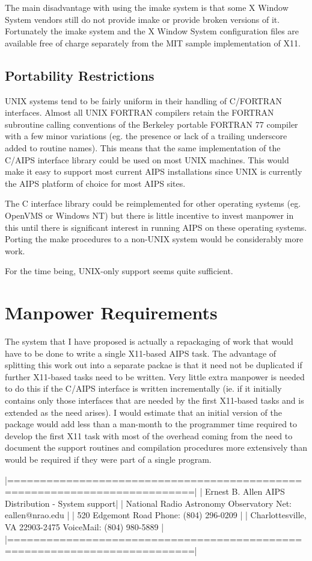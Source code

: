The main disadvantage with using the imake system is that some X
Window System vendors still do not provide imake or provide broken
versions of it.  Fortunately the imake system and the X Window System
configuration files are available free of charge separately from the
MIT sample implementation of X11.

\subsection{Portability Restrictions}

UNIX systems tend to be fairly uniform in their handling of C/FORTRAN
interfaces.  Almost all UNIX FORTRAN compilers retain the FORTRAN
subroutine calling conventions of the Berkeley portable FORTRAN 77
compiler with a few minor variations (eg. the presence or lack of a
trailing underscore added to routine names).  This means that the same
implementation of the C/AIPS interface library could be used on most
UNIX machines.  This would make it easy to support most current AIPS
installations since UNIX is currently the AIPS platform of choice for
most AIPS sites.

The C interface library could be reimplemented for other operating
systems (eg. OpenVMS or Windows NT) but there is little incentive to
invest manpower in this until there is significant interest in running
AIPS on these operating systems.  Porting the make procedures to a
non-UNIX system would be considerably more work.

For the time being, UNIX-only support seems quite sufficient.

\section{Manpower Requirements}
\label{sec:manpower}

The system that I have proposed is actually a repackaging of work that
would have to be done to write a single X11-based AIPS task.  The
advantage of splitting this work out into a separate packae is that it
need not be duplicated if further X11-based tasks need to be written.
Very little extra manpower is needed to do this if the C/AIPS
interface is written incrementally (ie. if it initially contains only
those interfaces that are needed by the first X11-based tasks and is
extended as the need arises).  I would estimate that an initial
version of the package would add less than a man-month to the
programmer time required to develop the first X11 task with most of
the overhead coming from the need to document the support routines and
compilation procedures more extensively than would be required if they
were part of a single program.





|==========================================================================|
| Ernest B. Allen                        AIPS Distribution - System support|
| National Radio Astronomy Observatory   Net:       eallen@nrao.edu        |
| 520 Edgemont Road                      Phone:     (804) 296-0209         |
| Charlottesville, VA 22903-2475         VoiceMail: (804) 980-5889         |
|==========================================================================|


